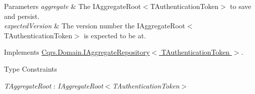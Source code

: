 \begin{DoxyParams}{Parameters}
{\em aggregate} & The I\+Aggregate\+Root$<$\+T\+Authentication\+Token$>$ to save and persist.\\
\hline
{\em expected\+Version} & The version number the I\+Aggregate\+Root$<$\+T\+Authentication\+Token$>$ is expected to be at.\\
\hline
\end{DoxyParams}


Implements \hyperlink{interfaceCqrs_1_1Domain_1_1IAggregateRepository_a306baf8aa6faabe893f93e5db5d3517d_a306baf8aa6faabe893f93e5db5d3517d}{Cqrs.\+Domain.\+I\+Aggregate\+Repository$<$ T\+Authentication\+Token $>$}.

\begin{Desc}
\item[Type Constraints]\begin{description}
\item[{\em T\+Aggregate\+Root} : {\em I\+Aggregate\+Root$<$T\+Authentication\+Token$>$}]\end{description}
\end{Desc}
